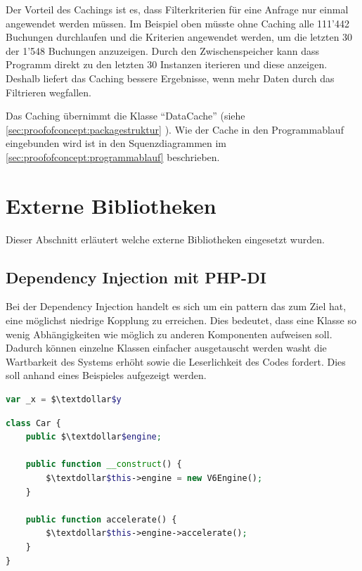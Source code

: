 Der Vorteil des Cachings ist es, dass Filterkriterien für eine Anfrage nur einmal angewendet werden müssen. Im Beispiel oben müsste ohne Caching alle 111'442 Buchungen durchlaufen und die Kriterien angewendet werden, um die letzten 30 der 1'548 Buchungen anzuzeigen. Durch den Zwischenspeicher kann dass Programm direkt zu den letzten 30 Instanzen iterieren und diese anzeigen. Deshalb liefert das Caching bessere Ergebnisse, wenn mehr Daten durch das Filtrieren wegfallen.

Das Caching übernimmt die Klasse "`DataCache"' (siehe \cref{sec:proofofconcept:packagestruktur} ). Wie der Cache in den Programmablauf eingebunden wird ist in den Squenzdiagrammen im \cref{sec:proofofconcept:programmablauf}  beschrieben.

\section{Externe Bibliotheken}
\label{sec:proofofconcept:externebibliotheken}
Dieser Abschnitt erläutert welche externe Bibliotheken eingesetzt wurden.

\subsection{Dependency Injection mit PHP-DI}
\label{sec:proofofconcept:dependency-injection}
Bei der Dependency Injection handelt es sich um ein \gls{pattern}
das zum Ziel hat, eine möglichst niedrige Kopplung zu erreichen. Dies bedeutet, dass eine Klasse so wenig Abhängigkeiten wie möglich zu anderen Komponenten aufweisen soll. Dadurch können einzelne Klassen einfacher ausgetauscht werden washt die Wartbarkeit des Systems erhöht sowie die Leserlichkeit des Codes fordert. Dies soll anhand eines Beispieles aufgezeigt werden.

\begin{lstlisting}[language=php]
var _x = $\textdollar$y
\end{lstlisting}

\begin{lstlisting}[language=php]
class Car {
	public $\textdollar$engine;
	
	public function __construct() {
		$\textdollar$this->engine = new V6Engine();
	}
	
	public function accelerate() {
		$\textdollar$this->engine->accelerate();
	}
}
\end{lstlisting}

